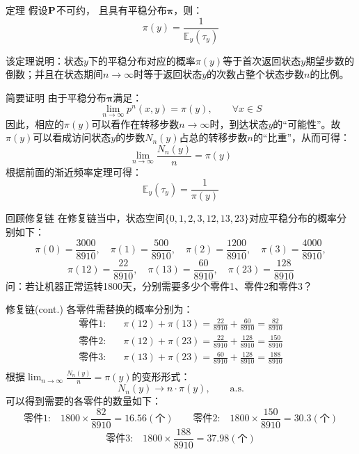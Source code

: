 \documentclass[t]{beamer}
\newcommand{\E}{\mathbb{E}}
\begin{document}
\begin{frame}{定理}
    假设${\bf P}$不可约， 且具有平稳分布$\bm{\pi}$，则：
    \begin{equation*}
    \pi(y)=\frac{1}{\E_y(\tau_y)}
    \end{equation*}

    该定理说明：状态$y$下的平稳分布对应的概率$\pi(y)$等于首次返回状态$y$期望步数的倒数；并且在状态期间$n\to \infty$时等于返回状态$y$的次数占整个状态步数$n$的比例。
\end{frame}



\begin{frame}{简要证明}
    由于平稳分布$\bm{\pi}$满足：
\[\lim_{n\to\infty}p^n(x,y)=\pi(y),\qquad \forall x\in S \]
因此，相应的$\pi(y)$可以看作在转移步数$n\to \infty$时，到达状态$y$的“可能性”。故$\pi(y)$可以看成访问状态$y$的步数$N_n(y)$占总的转移步数$n$的“比重”，从而可得：
\begin{equation*}
\lim_{n\to\infty}\frac{N_n(y)}{n}=\pi(y)
\end{equation*}
根据前面的渐近频率定理可得：
\begin{equation*}
\E_y(\tau_y)=\frac{1}{\pi(y)} 
\end{equation*}
\end{frame}


\begin{frame}{回顾修复链}
    在修复链当中，状态空间$\{0,1,2,3,12,13,23\}$对应平稳分布的概率分别如下：
    \[\pi(0)=\frac{3000}{8910},\quad \pi(1)=\frac{500}{8910},\quad \pi(2)=\frac{1200}{8910},\quad \pi(3)=\frac{4000}{8910},\]
    \[\pi(12)=\frac{22}{8910},\quad \pi(13)=\frac{60}{8910},\quad \pi(23)=\frac{128}{8910} \]
    问：若让机器正常运转1800天，分别需要多少个零件1、零件2和零件3？
\end{frame}



\begin{frame}{修复链(cont.)}\small
    各零件需替换的概率分别为：
    \[\begin{split}
    \text{零件1:}&\quad \pi(12)+\pi(13)=\frac{22}{8910}+\frac{60}{8910}=\frac{82}{8910}\\
    \text{零件2:}&\quad \pi(12)+\pi(23)=\frac{22}{8910}+\frac{128}{8910}=\frac{150}{8910}\\
    \text{零件3:}&\quad \pi(13)+\pi(23)=\frac{60}{8910}+\frac{128}{8910}=\frac{188}{8910}\\
    \end{split}\]
    根据$\displaystyle\lim_{n\to\infty}\frac{N_n(y)}{n}=\pi(y)$的变形形式：
    \[N_n(y)\to n\cdot \pi(y),\qquad \text{a.s.}\]
    可以得到需要的各零件的数量如下：
    \[
    \text{零件1:}\quad 1800\times \frac{82}{8910} =16.56(\text{个})\qquad
    \text{零件2:}\quad 1800\times\frac{150}{8910} =30.3(\text{个})\]\[
    \text{零件3:}\quad 1800\times\frac{188}{8910} =37.98(\text{个})
    \]
\end{frame}
\end{document}
